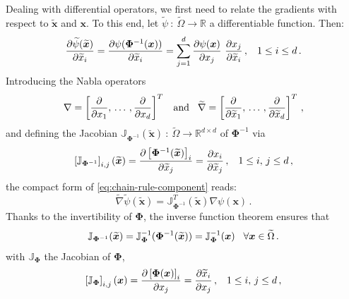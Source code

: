 \documentclass[12pt, a4paper, twoside, openright]{report}
\numberwithin{equation}{chapter}
\theoremstyle{theorem}
\theoremstyle{definition}
\theoremstyle{remark}
\theoremstyle{proposition}
\numberwithin{figure}{chapter}
\newcommand{\wt}[1]{\widetilde{#1}}
\newcommand{\bg}[1]{\boldsymbol{#1}}
\begin{document}
		Dealing with differential operators, we first need to relate the gradients with respect to $\wt{\bg{x}}$ and $\bg{x}$. To this end, let $\wt{\psi} ~ : ~ \wt{\Omega} \rightarrow \mathbb{R}$ a differentiable function. Then:
		\begin{equation}
			\label{eq:chain-rule-component}
			\dfrac{\partial \wt{\psi}(\wt{\bg{x}})}{\partial \wt{x}_i} = \dfrac{\partial \psi(\bg{\Phi}^{-1}(\bg{x}))}{\partial \wt{x}_i} = \sum_{j = 1}^d \dfrac{\partial \psi(\bg{x})}{\partial x_j} ~ \dfrac{\partial x_j}{\partial \wt{x}_i} \, , \hspace*{0.3cm} 1 \leq i \leq d \, .
		\end{equation}  
		Introducing the Nabla operators
		\begin{equation*}
			\nabla = \left[ \dfrac{\partial}{\partial x_1}, \, \ldots \, , \dfrac{\partial}{\partial x_d} \right]^T \hspace*{0.3cm} \text{and} \hspace*{0.3cm} \wt{\nabla} = \left[ \dfrac{\partial}{\partial \wt{x}_1}, \, \ldots \, , \dfrac{\partial}{\partial \wt{x}_d} \right]^T \, ,
		\end{equation*}
		and defining the Jacobian $\mathbb{J}_{\bg{\Phi}^{-1}}(\wt{\bg{x}}) ~ : ~ \wt{\Omega} \rightarrow \mathbb{R}^{d \times d}$ of $\bg{\Phi}^{-1}$ via
		\begin{equation*}
			\left[ \mathbb{J}_{\bg{\Phi}^{-1}} \right]_{i,j}(\wt{\bg{x}}) = \dfrac{\partial \left[ \bg{\Phi}^{-1}(\wt{\bg{x}}) \right]_i}{\partial \wt{x}_j} = \dfrac{\partial x_i}{\partial \wt{x}_j} \, , \hspace*{0.3cm} 1 \leq i, \, j \leq d \, ,
		\end{equation*} 
		the compact form of \eqref{eq:chain-rule-component} reads:
		\begin{equation}
			\label{eq:chain-rule}
			\wt{\nabla}{\wt{\psi}}(\wt{\bg{x}}) = \mathbb{J}_{\bg{\Phi}^{-1}}^T (\wt{\bg{x}}) \nabla{\psi}(\bg{x}) \, .
		\end{equation}  
		Thanks to the invertibility of $\bg{\Phi}$, the inverse function theorem \cite{Rud64} ensures that
		\begin{equation*}
			\mathbb{J}_{\bg{\Phi}^{-1}} (\wt{\bg{x}}) = \mathbb{J}^{-1}_{\bg{\Phi}} (\bg{\Phi}^{-1}(\wt{\bg{x}})) = \mathbb{J}^{-1}_{\bg{\Phi}} (\bg{x}) \hspace*{0.3cm} \forall \bg{x} \in \wt{\Omega} \, .
		\end{equation*}
		with $\mathbb{J}_{\bg{\Phi}}$ the Jacobian of $\bg{\Phi}$,
		\begin{equation*}
			\left[ \mathbb{J}_{\bg{\Phi}} \right]_{i,j}(\bg{x}) = \dfrac{\partial \left[ \bg{\Phi}(\bg{x}) \right]_i}{\partial x_j} = \dfrac{\partial \wt{x}_i}{\partial x_j} \, , \hspace*{0.3cm} 1 \leq i, \, j \leq d \, ,
		\end{equation*}
\end{document}

